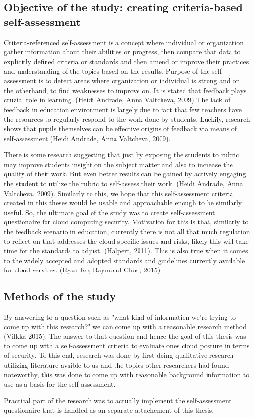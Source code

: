 \documentclass{article}
\begin{document}
\subsection{Objective of the study: creating criteria-based self-assessment}
Criteria-referenced self-assessment is a concept where individual or organization gather information about their abilities or progress, then compare that data to explicitly defined criteria or standards and then amend or improve their practices and understanding of the topics based on the results.
Purpose of the self-assessment is to detect areas where organization or individual is strong and on the otherhand, to find weaknesses to improve on. It is stated that feedback plays cruzial role in learning. (Heidi Andrade, Anna Valtcheva, 2009)
The lack of feedback in education environment is largely due to fact that few teachers have the resources to regularly respond to the work done by students. Luckily, research shows that pupils themselves can be effective origins of feedback via means of self-assessment.(Heidi Andrade, Anna Valtcheva, 2009).
\par
There is some research suggesting that just by exposing the students to rubric may improve students insight on the subject matter and also to increase the quality of their work. But even better results can be gained by actively engaging the student to utilize the rubric to self-assess their work. (Heidi Andrade, Anna Valtcheva, 2009). Similarly to this, we hope that this self-assessment criteria created in this theses would be usable and approachable enough to be similarly useful. 
So, the ultimate goal of the study was to create self-assessment questionaire for cloud computing security. Motivation for this is that, similarly to the feedback scenario in education, currently there is not all that much regulation to reflect on that addresses the cloud specific issues and risks, likely this will take time for the standards to adjust. (Halpert, 2011). This is also true when it comes to the widely accepted and adopted standards and guidelines currently available for cloud services. (Ryan Ko, Raymond Choo, 2015)
\subsection{Methods of the study}
By answering to a question such as "what kind of information we're trying to come up with this research?" we can come up with a reasonable research method (Vilkka 2015).
The answer to that question and hence the goal of this thesis was to come up with a self-assessment criteria to evaluate ones cloud posture in terms of security.
To this end, research was done by first doing qualitative research utilizing literature avaible to us and the topics other researchers had found noteworthy, this was done to come up with reasonable background information to use as a basis for the self-assessment.
\par
Practical part of the research was to actually implement the self-assessment questionaire that is handled as an separate attachement of this thesis.
\end{document}
